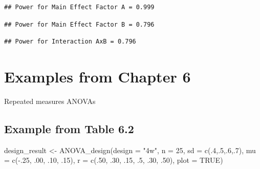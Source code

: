 \documentclass[
]{book}
\newenvironment{Shaded}{\begin{snugshade}}{\end{snugshade}}
\newcommand{\AttributeTok}[1]{\textcolor[rgb]{0.77,0.63,0.00}{#1}}
\newcommand{\ConstantTok}[1]{\textcolor[rgb]{0.00,0.00,0.00}{#1}}
\newcommand{\DecValTok}[1]{\textcolor[rgb]{0.00,0.00,0.81}{#1}}
\newcommand{\FunctionTok}[1]{\textcolor[rgb]{0.00,0.00,0.00}{#1}}
\newcommand{\NormalTok}[1]{#1}
\newcommand{\OtherTok}[1]{\textcolor[rgb]{0.56,0.35,0.01}{#1}}
\newcommand{\SpecialCharTok}[1]{\textcolor[rgb]{0.00,0.00,0.00}{#1}}
\newcommand{\StringTok}[1]{\textcolor[rgb]{0.31,0.60,0.02}{#1}}
\begin{document}
\begin{verbatim}
## Power for Main Effect Factor A = 0.999
\end{verbatim}

\begin{verbatim}
## Power for Main Effect Factor B = 0.796
\end{verbatim}

\begin{verbatim}
## Power for Interaction AxB = 0.796
\end{verbatim}

\hypertarget{examples-from-chapter-6}{%
\section{Examples from Chapter 6}\label{examples-from-chapter-6}}

Repeated measures ANOVAs

\hypertarget{example-from-table-6.2}{%
\subsection{Example from Table 6.2}\label{example-from-table-6.2}}

\begin{Shaded}
\begin{Highlighting}[]
\NormalTok{design\_result }\OtherTok{\textless{}{-}} \FunctionTok{ANOVA\_design}\NormalTok{(}\AttributeTok{design =} \StringTok{"4w"}\NormalTok{,}
                              \AttributeTok{n =} \DecValTok{25}\NormalTok{,}
                              \AttributeTok{sd =} \FunctionTok{c}\NormalTok{(.}\DecValTok{4}\NormalTok{,.}\DecValTok{5}\NormalTok{,.}\DecValTok{6}\NormalTok{,.}\DecValTok{7}\NormalTok{),}
                              \AttributeTok{mu =} \FunctionTok{c}\NormalTok{(}\SpecialCharTok{{-}}\NormalTok{.}\DecValTok{25}\NormalTok{, .}\DecValTok{00}\NormalTok{, .}\DecValTok{10}\NormalTok{, .}\DecValTok{15}\NormalTok{),}
                              \AttributeTok{r =} \FunctionTok{c}\NormalTok{(.}\DecValTok{50}\NormalTok{, }
\NormalTok{                                    .}\DecValTok{30}\NormalTok{,}
\NormalTok{                                    .}\DecValTok{15}\NormalTok{, }
\NormalTok{                                    .}\DecValTok{5}\NormalTok{,}
\NormalTok{                                    .}\DecValTok{30}\NormalTok{, }
\NormalTok{                                    .}\DecValTok{50}\NormalTok{),}
                              \AttributeTok{plot =} \ConstantTok{TRUE}\NormalTok{)}
\end{Highlighting}
\end{Shaded}
\end{document}
